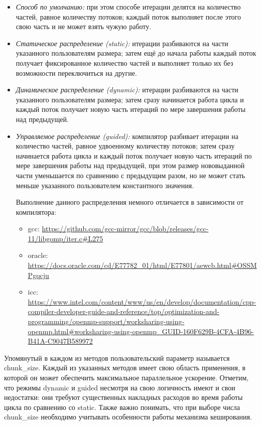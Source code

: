 \begin{itemize}
    \item\textit{Способ по умолчанию:} при этом способе итерации делятся на количество частей, равное количеству потоков; каждый поток выполняет после этого свою часть и не может взять чужую работу.
    \item\textit{Статическое распределение (static):} итерации разбиваются на части указанного пользователям размера; затем ещё до начала работы каждый поток получает фиксированное количество частей и выполняет только их без возможности переключиться на другие.
    \item\textit{Динамическое распределение (dynamic):} итерации разбиваются на части указанного пользователям размера; затем сразу начинается работа цикла и каждый поток получает новую часть итераций по мере завершения работы над предыдущей.
    \item\textit{Управляемое распределение (guided):} компилятор разбивает итерации на количество частей, равное удвоенному количеству потоков; затем сразу начинается работа цикла и каждый поток получает новую часть итераций по мере завершения работы над предыдущей, при этом размер нововыданной части уменьшается по сравнению с предыдущим разом, но не может стать меньше указанного пользователем константного значения.

Выполнение данного распределения немного отличается в зависимости от компилятора:

    \begin{itemize}
    \item gcc: \url{https://github.com/gcc-mirror/gcc/blob/releases/gcc-11/libgomp/iter.c#L275}
    \item oracle: \url{https://docs.oracle.com/cd/E77782_01/html/E77801/aewcb.html#OSSMPgqcju}
    \item icc: \url{https://www.intel.com/content/www/us/en/develop/documentation/cpp-compiler-developer-guide-and-reference/top/optimization-and-programming/openmp-support/worksharing-using-openmp.html#worksharing-using-openmp_GUID-160F629B-4CFA-4B96-B41A-C9047B589972}
    \end{itemize}
\end{itemize}

Упомянутый в каждом из методов пользовательский параметр называется chunk\_size. Каждый из указанных методов имеет свою область применения, в которой он может обеспечить максимальное параллельное ускорение. Отметим, что режимы dynamic и guided несмотря на свою логичность имеют и свои недостатки: они требуют существенных накладных расходов во время работы цикла по сравнению со static. Также важно понимать, что при выборе числа chunk\_size необходимо учитывать особенности работы механизма кеширования.

